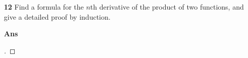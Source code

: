 \documentclass[paper=usletter, fontsize=12pt]{article}
\begin{document}
\begin{itemize}
\begin{itemize}
            \item[\textbf{12}] Find a formula for the $n$th derivative of the
            product of two functions, and give a detailed proof by induction.
            \item[\textbf{Ans}]
            \begin{proof}[\unskip\nopunct]
            \end{proof}
            \vspace{0.2in}

        \end{itemize}

    \end{itemize}
\end{document}
